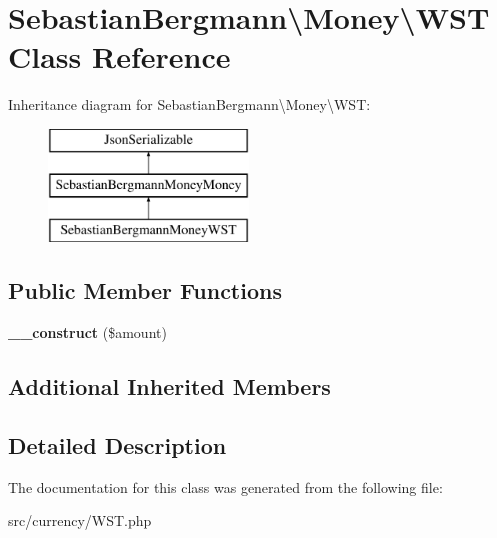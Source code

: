 \hypertarget{classSebastianBergmann_1_1Money_1_1WST}{}\section{Sebastian\+Bergmann\textbackslash{}Money\textbackslash{}W\+S\+T Class Reference}
\label{classSebastianBergmann_1_1Money_1_1WST}
Inheritance diagram for Sebastian\+Bergmann\textbackslash{}Money\textbackslash{}W\+S\+T\+:\begin{figure}[H]
\begin{center}
\leavevmode
\includegraphics[height=3.000000cm]{classSebastianBergmann_1_1Money_1_1WST}
\end{center}
\end{figure}
\subsection*{Public Member Functions}
\begin{DoxyCompactItemize}
\item 
\hypertarget{classSebastianBergmann_1_1Money_1_1WST_a21ba2cd0270ee11c385510808a224bcf}{}{\bfseries \+\_\+\+\_\+construct} (\$amount)\label{classSebastianBergmann_1_1Money_1_1WST_a21ba2cd0270ee11c385510808a224bcf}

\end{DoxyCompactItemize}
\subsection*{Additional Inherited Members}


\subsection{Detailed Description}


The documentation for this class was generated from the following file\+:\begin{DoxyCompactItemize}
\item 
src/currency/W\+S\+T.\+php\end{DoxyCompactItemize}
